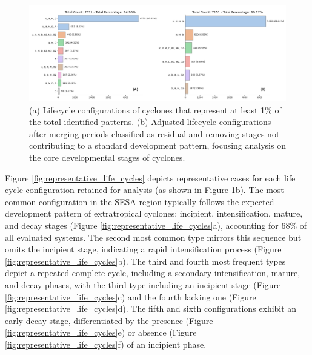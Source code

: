 \begin{figure}[ht]
\centering
\includegraphics[width=\textwidth]{figs_4/combined_barplots_filtered.png}
\caption[Filtered life cycle configurations]{(a) Lifecycle configurations of cyclones that represent at least 1\% of the total identified patterns. (b) Adjusted lifecycle configurations after merging periods classified as residual and removing stages not contributing to a standard development pattern, focusing analysis on the core developmental stages of cyclones.}
\label{fig:filtered_lifecycle_configurations}
\end{figure}

Figure \ref{fig:representative_life_cycles} depicts representative cases for each life cycle configuration retained for analysis (as shown in Figure \ref{fig:filtered_lifecycle_configurations}b). The most common configuration in the SESA region typically follows the expected development pattern of extratropical cyclones: incipient, intensification, mature, and decay stages (Figure \ref{fig:representative_life_cycles}a), accounting for 68\% of all evaluated systems. The second most common type mirrors this sequence but omits the incipient stage, indicating a rapid intensification process (Figure \ref{fig:representative_life_cycles}b). The third and fourth most frequent types depict a repeated complete cycle, including a secondary intensification, mature, and decay phases, with the third type including an incipient stage (Figure \ref{fig:representative_life_cycles}c) and the fourth lacking one (Figure \ref{fig:representative_life_cycles}d). The fifth and sixth configurations exhibit an early decay stage, differentiated by the presence (Figure \ref{fig:representative_life_cycles}e) or absence (Figure \ref{fig:representative_life_cycles}f) of an incipient phase.

